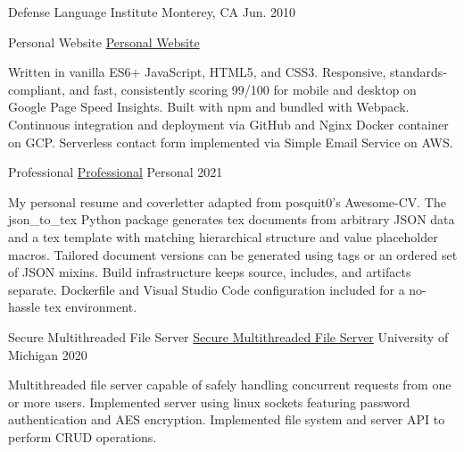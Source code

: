 \documentclass[11pt, a4paper]{cv}
\newenvironment{projects}{}{\par}
\newenvironment{education}{}{\par}
\newenvironment{cv}{}{\par}
\newenvironment{degrees}{\begin{separatedItems}{\headerSocialSep}}{\end{separatedItems}}
\renewcommand{\headerSocialSep}{\quad\textbar\quad}
\begin{document}
\begin{cv}
\begin{education}
\begin{cventries}
{\begin{degrees}
\end{degrees}}
{Defense Language Institute}
{Monterey, CA}
{Jun. 2010}
{\begin{cvitems}
\end{cvitems}}
\end{cventries}
\end{education}
\begin{projects}
\begin{cventries}
\cventrycompact
{
{Personal Website}
{\color{hrefblue}\href{https://brandon.mosher.xyz}{Personal Website}}}
{}
{}
{}
{\begin{cvparagraph}
Written in vanilla ES6+ JavaScript, HTML5, and CSS3. Responsive, standards-compliant, and fast, consistently scoring 99/100 for mobile and desktop on Google Page Speed Insights. Built with npm and bundled with Webpack. Continuous integration and deployment via GitHub and Nginx Docker container on GCP. Serverless contact form implemented via Simple Email Service on AWS.
\end{cvparagraph}}
\cventrycompact
{
{Professional}
{\color{hrefblue}\href{https://github.com/brandonmosher/professional}{Professional}}}
{}
{Personal}
{2021}
{\begin{cvparagraph}
My personal resume and coverletter adapted from posquit0's Awesome-CV. The json\_to\_tex Python package generates tex documents from arbitrary JSON data and a tex template with matching hierarchical structure and value placeholder macros. Tailored document versions can be generated using tags or an ordered set of JSON mixins. Build infrastructure keeps source, includes, and artifacts separate. Dockerfile and Visual Studio Code configuration included for a no-hassle tex environment.
\end{cvparagraph}}
\cventrycompact
{\ifstrempty{}
{Secure Multithreaded File Server}
{\color{hrefblue}\href{}{Secure Multithreaded File Server}}}
{}
{University of Michigan}
{2020}
{\begin{cvparagraph}
Multithreaded file server capable of safely handling concurrent requests from one or more users. Implemented server using linux sockets featuring password authentication and AES encryption. Implemented file system and server API to perform CRUD operations.

\end{cvparagraph}}
\end{cventries}
\end{projects}
\end{cv}
\end{document}
